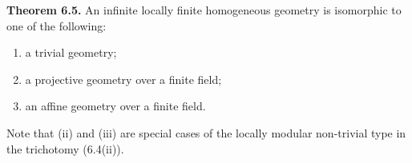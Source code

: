 \textbf{Theorem 6.5.} An infinite locally finite homogeneous geometry is isomorphic to one of the following:
\begin{enumerate}
\item[(i)] a trivial geometry;
\item[(ii)] a projective geometry over a finite field;
\item[(iii)] an affine geometry over a finite field.
\end{enumerate}

Note that (ii) and (iii) are special cases of the locally modular non-trivial type in the trichotomy (6.4(ii)).
